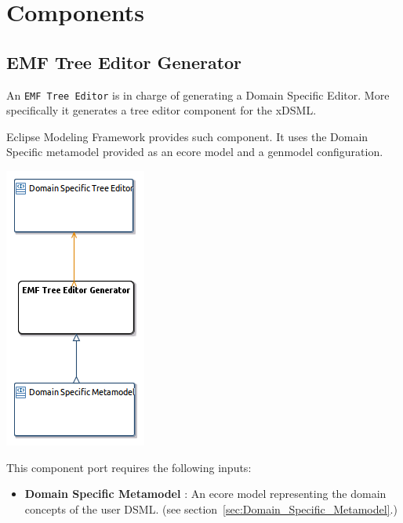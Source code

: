 \documentclass{gemoc} %
\begin{document}
\section{Components}

\subsection{EMF Tree Editor Generator}
\label{sec:EMF_Tree_Editor_Generator}

An \texttt{EMF Tree Editor} is in charge of generating a Domain Specific Editor. More specifically it generates a tree editor component for the xDSML. 

Eclipse Modeling Framework provides such component. It uses the Domain Specific metamodel provided as an ecore model and a genmodel configuration.
\begin{center}
\includegraphics*[trim=0.0cm 0.0cm 0cm 0.0cm, clip=true]{../images/generated/Generated_EMF_Tree_Editor_Generator.png}
\end{center}

This component port requires the following inputs:
\begin{itemize}
  \item \textbf{Domain Specific Metamodel} :
An ecore model representing the domain concepts of the user DSML.
(see section~\ref{sec:Domain_Specific_Metamodel}.)
\end{itemize}
\end{document}
